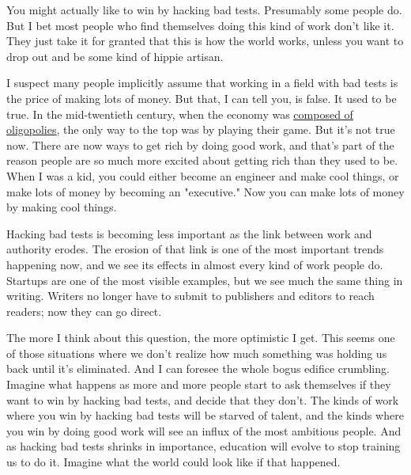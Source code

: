 You might actually like to win by
                  hacking bad tests. Presumably some people do. But I bet most
                  people who find themselves doing this kind of work don't like
                  it. They just take it for granted that this is how the world
                  works, unless you want to drop out and be some kind of hippie
                  artisan.

I suspect many people implicitly assume
                  that working in a field with bad tests is the price of making
                  lots of money. But that, I can tell you, is false. It used to
                  be true. In the mid-twentieth century, when the economy was
                  \href{http://www.paulgraham.com/re.html}{\underline{composed of oligopolies}}, the only way to the top was by playing their game. But it's
                  not true now. There are now ways to get rich by doing good
                  work, and that's part of the reason people are so much more
                  excited about getting rich than they used to be. When I was a
                  kid, you could either become an engineer and make cool things,
                  or make lots of money by becoming an "executive." Now you can
                  make lots of money by making cool things.

Hacking
                  bad tests is becoming less important as the link between work
                  and authority erodes. The erosion of that link is one of the
                  most important trends happening now, and we see its effects in
                  almost every kind of work people do. Startups are one of the
                  most visible examples, but we see much the same thing in
                  writing. Writers no longer have to submit to publishers and
                  editors to reach readers; now they can go direct.

The
                  more I think about this question, the more optimistic I get.
                  This seems one of those situations where we don't realize how
                  much something was holding us back until it's eliminated. And
                  I can foresee the whole bogus edifice crumbling. Imagine what
                  happens as more and more people start to ask themselves if
                  they want to win by hacking bad tests, and decide that they
                  don't. The kinds of work where you win by hacking bad tests
                  will be starved of talent, and the kinds where you win by
                  doing good work will see an influx of the most ambitious
                  people. And as hacking bad tests shrinks in importance,
                  education will evolve to stop training us to do it. Imagine
                  what the world could look like if that happened.

